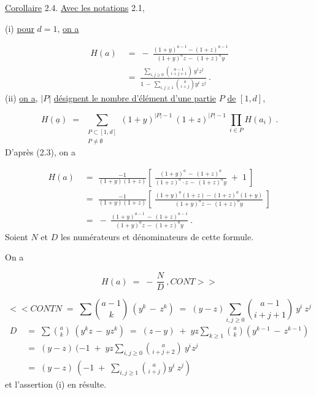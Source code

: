 
\underline{Corollaire} 2.4. \underline{Avec les notations} 2.1,

(i) \quad \underline{pour} $d = 1$, \underline{on a}

\begin{equation*}
\begin{aligned}
H(a) \;&=\; -\ \frac{(1+y)^{a-1} - (1+z)^{a-1}}{(1+y)^{a}z \,-\, (1+z)^{a}y}\\[2ex]
&=\; \frac{\displaystyle\sum_{i,j\geq 0}\binom{a-1}{i+j+1}\ y^{i}z^{j}}{1 \,-\, \displaystyle\sum_{i,j\geq 1}\binom{a}{i+j}y^{i}\ z^{j}}\ .
\end{aligned}
\end{equation*}
(ii) \quad \underline{on a}, $|P|$ \underline{désignent le nombre d'élément d'une partie} $P$ \underline{de} $[1,d]$,

\begin{equation*}
H(\underline{a}) \;=\; \sum_{\substack{P \subset [1,d] \\ P \neq \emptyset}} (1+y)^{|P|-1}\ (1+z)^{|P|-1}\ \prod_{i \in P} H(a_{i})\ .
\end{equation*}
D'après (2.3), on a

\begin{equation*}
\begin{aligned}
H(a) \;&=\; \frac{-1}{(1+y)(1+z)}\left[\ \frac{(1+y)^{a} \,-\, (1+z)^{a}}{(1+z)^{a}\cdot z \,-\, (1+z)^{a}y} \;+\; 1\ \right]\\[2ex]
&=\; \frac{-1}{(1+y)(1+z)}\left[\ \frac{(1+y)^{a}(1+z)-(1+z)^{a}(1+y)}{(1+y)^{a}z \,-\, (1+z)^{a}y}\ \right]\\[2ex]
&=\; -\ \frac{(1+y)^{a-1} \,-\, (1+z)^{a-1}}{(1+y)^{a}z \,-\, (1+z)^{a}y}\ .
\end{aligned}
\end{equation*}
Soient $N$ et $D$ les numérateurs et dénominateurs de cette formule.

On a

\begin{equation*}
H(a) \;=\; -\,\frac{N}{D}\ ,  CONT>>
\end{equation*}


\begin{equation*}
<<CONT N \;=\; \sum \binom{a-1}{k}\ (y^{k} \,-\, z^{k}) \;=\; (y-z) \sum_{i,j\geq 0}\binom{a-1}{i+j+1}\ y^{i}\ z^{j}
\end{equation*}
\begin{equation*}
\begin{aligned}
D \;&=\; \sum \binom{a}{k}\ (y^{k}z \,-\, yz^{k}) \;=\; (z-y) \;+\; yz \sum_{k\geq 1}\binom{a}{k}\!\left(y^{k-1} \,-\, z^{k-1}\right)\\[2ex]
&=\; (y-z)\ (-1 \;+\; yz \sum_{i,j\geq 0}\binom{a}{i+j+2}\ y^{i}z^{j}\\[2ex]
&=\; (y-z)\ (-1 \;+\; \sum_{i,j\geq 1}\binom{a}{i+j}y^{i}\ z^{j})
\end{aligned}
\end{equation*}
et l'assertion (i) en résulte.


